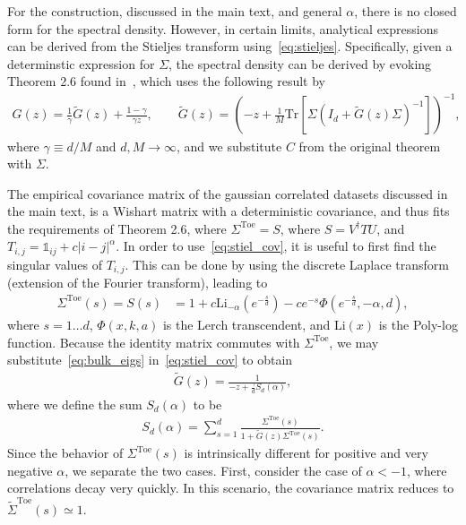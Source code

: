 \documentclass{article}
\DeclareMathOperator{\tr}{tr}
\def\tr{\textrm{Tr}}
\begin{document}
For the construction, discussed in the main text, and general $\alpha$, there is no closed form for the spectral density. However, in certain limits, analytical expressions can be derived from the Stieljes transform using~\cref{eq:stieljes}. 
Specifically, given a determinstic expression for $\Sigma$, the spectral density can be derived by evoking Theorem 2.6 found in~\citet{couillet_liao_2022}, which uses the following result by~\citet{silverstein1995empirical}
\begin{align}
\label{eq:stiel_cov}
    G(z) = \frac{1}{\gamma}\tilde{G}(z)
    +
    \frac{1-\gamma }{\gamma z}, 
    \qquad
    \tilde{G}(z)
    =
    \left(
    -z + \frac{1}{M}
    \tr \left[ \Sigma (I_d + \tilde{G}(z) \Sigma )^{-1} \right]
    \right)^{-1},
\end{align}
where $\gamma \equiv d/M$ and $d,M \to \infty$, and we substitute $C$ from the original theorem with $\Sigma$.

The empirical covariance matrix of the gaussian correlated datasets discussed in the main text, is a Wishart matrix with a deterministic covariance, and thus fits the requirements of Theorem 2.6, where $\Sigma^\mathrm{Toe}=S$, where $S = V^\dagger T U$, and $T_{i,j}=\mathbb{1}_{ij}+c|i-j|^\alpha$. 
In order to use~\cref{eq:stiel_cov}, it is useful to first find the singular values of $T_{i,j}$. This can be done by using the discrete Laplace transform (extension of the Fourier transform), leading to  
\begin{align}
\label{eq:bulk_eigs}
    \Sigma^\mathrm{Toe}(s)= S(s)
    &=
   1
   +c \text{Li}_{-\alpha }\left(e^{-\frac{s}{d}}\right)
   -c e^{-s} \Phi \left(e^{-\frac{s}{d}},-\alpha ,d\right), 
\end{align}
where $s=1\ldots d$, $\Phi(x,k,a)$ is the Lerch transcendent, and $\text{Li}(x)$ is the Poly-log function.
Because the identity matrix commutes with $\Sigma^\mathrm{Toe}$, we may substitute~\cref{eq:bulk_eigs} in~\cref{eq:stiel_cov} to obtain
\begin{align}
\label{eq:stiel_solve}
\tilde{G}(z) =
\frac{1}
    {-z+\frac{\gamma}{d} S_d(\alpha)
    },
\end{align}
where we define the sum $S_d(\alpha)$ to be
\begin{align}
\label{eq:sum}
S_d(\alpha)=\sum_{s=1}^d
\frac{{\Sigma}^\mathrm{Toe}(s)}{1+ \tilde{G}(z) {\Sigma}^\mathrm{Toe}(s)}
     .
\end{align}
Since the behavior of ${\Sigma}^\mathrm{Toe}(s)$ is intrinsically different for positive and very negative $\alpha$, we separate the two cases. 
First, consider the case of $\alpha <-1$, where correlations decay very quickly. In this scenario, the covariance matrix reduces to $\tilde{\Sigma}^\mathrm{Toe}(s)\simeq 1$. 
\end{document}
